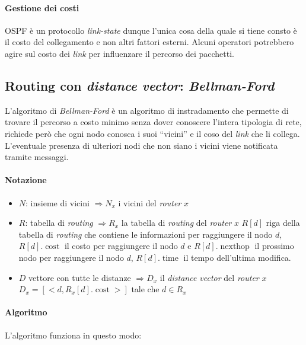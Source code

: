         \paragraph{Gestione dei costi} \Acrshort*{OSPF} è un protocollo \textit{link-state} dunque l'unica cosa della quale si tiene consto è il costo del collegamento e non altri fattori esterni. Alcuni operatori potrebbero agire sul costo dei \textit{link} per influenzare il percorso dei pacchetti.
    \subsection{Routing con \textit{distance vector}: \textit{Bellman-Ford}}
        L'algoritmo di \textit{Bellman-Ford} è un algoritmo di instradamento che permette di trovare il percorso a costo minimo senza dover conoscere l'intera tipologia di rete, richiede però che ogni nodo conosca i suoi ``vicini'' e il coso del \textit{link} che li collega. L'eventuale presenza di ulteriori nodi che non siano i vicini viene notificata tramite messaggi.
        \paragraph{Notazione} \begin{itemize}
            \item $N$: insieme di vicini $\Rightarrow N_x$ i vicini del \textit{router} $x$
            \item $R$: tabella di \textit{routing} $\Rightarrow R_x$ la tabella di \textit{routing} del \textit{router} $x$
                \subitem $R[d]$ riga della tabella di \textit{routing} che contiene le informazioni per raggiungere il nodo $d$, $R[d].\operatorname{cost}$ il costo per raggiungere il nodo $d$ e $R[d].\operatorname{nexthop}$ il prossimo nodo per raggiungere il nodo $d$, $R[d].\operatorname{time}$ il tempo dell'ultima modifica.
            \item $D$ vettore con tutte le distanze $\Rightarrow D_x$ il \textit{distance vector} del \textit{router} $x$
                \subitem $D_x=[<d,R_x[d].\operatorname{cost}>]$ tale che $d\in R_x$
        \end{itemize}
        \paragraph{Algoritmo} L'algoritmo funziona in questo modo:

